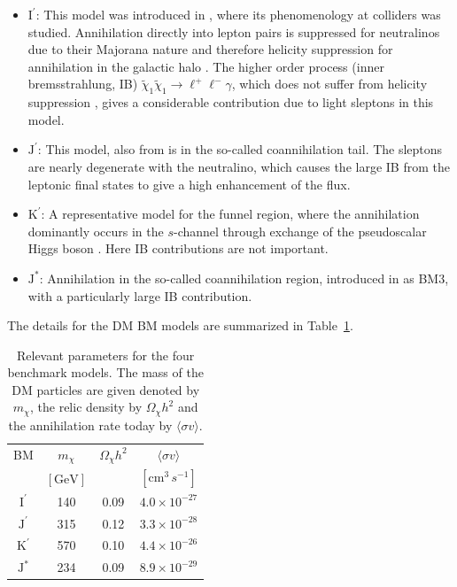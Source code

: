 \documentclass[10pt,aps,pra,reprint,amsmath,amsfonts,amssymb,showpacs,nofootinbib,floatfix]{revtex4-1}
\newcommand{\rmn}{\mathrm}
\newcommand{\Kp}{\rmn{K}^\prime}
\newcommand{\Ip}{\rmn{I}^\prime}
\newcommand{\Js}{\rmn{J}^*}
\newcommand{\Jp}{\rmn{J}^\prime}
\newcommand{\sigmaannv}{\ensuremath{\langle\sigma v\rangle}}
\begin{document}
\begin{itemize}
\item
 $\Ip$: This model was introduced in \cite{2004EPJC...33..273B}, where
  its phenomenology at colliders was studied. Annihilation directly
  into lepton pairs is suppressed for neutralinos due to their
  Majorana nature and therefore helicity suppression for annihilation
  in the galactic halo \cite{1983PhRvL..50.1419G}. The higher order
  process (inner bremsstrahlung, IB) $\tilde\chi_1\tilde\chi_1\to
  \ell^+\ell^-\gamma$, which does not suffer from helicity suppression
  \cite{1989PhLB..225..372B,2008JHEP...01..049B}, gives a considerable
  contribution due to light sleptons in this model.

\item $\Jp$: This model, also from \cite{2004EPJC...33..273B} is in the
  so-called coannihilation tail. The sleptons are nearly degenerate
  with the neutralino, which causes the large IB from the leptonic
  final states to give a high enhancement of the flux.

\item $\Kp$: A representative model for the funnel region, where the
  annihilation dominantly occurs in the $s$-channel through exchange
  of the pseudoscalar Higgs boson \cite{2004EPJC...33..273B}. Here IB
  contributions are not important.

\item $\Js$: Annihilation in the so-called coannihilation region,
  introduced in \cite{2008JHEP...01..049B} as BM3, with a particularly
  large IB contribution.

\end{itemize}

The details for the DM BM models are summarized in Table~\ref{tab:BMpara}.

\begin{table}
\begin{tabular}{cccc}
\hline\hline
      BM & $m_{\chi}$ & $\Omega_{\chi} h^2$ & $\sigmaannv$\\
         & $[\rmn{GeV}]$ & & $[\rmn{cm}^3\,s^{-1}]$\\
\hline
$\Ip$ & 140 & 0.09 & $4.0\times 10^{-27}$ \\
$\Jp$ & 315 & 0.12 & $3.3\times 10^{-28}$ \\
$\Kp$ & 570 & 0.10 & $4.4\times 10^{-26}$ \\
$\Js$ & 234 & 0.09 & $8.9\times 10^{-29}$ \\
\hline\hline
\end{tabular}
 \caption{Relevant parameters for the four benchmark models. The mass
   of the DM particles are given denoted by $m_{\chi}$, the relic
   density by $\Omega_{\chi} h^2$ and the annihilation rate today by
   $\sigmaannv$.\label{tab:BMpara}}
\end{table}
\end{document}
